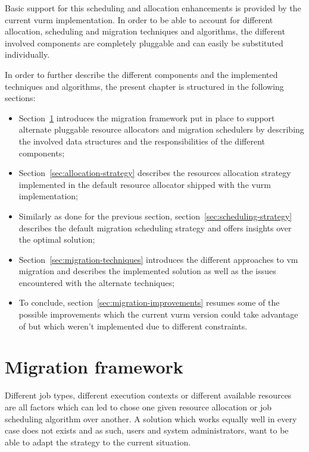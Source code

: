 Basic support for this scheduling and allocation enhancements is provided by the current \gls{vurm} implementation. In order to be able to account for different allocation, scheduling and migration techniques and algorithms, the different involved components are completely pluggable and can easily be substituted individually.

In order to further describe the different components and the implemented techniques and algorithms, the present chapter is structured in the following sections:

\begin{itemize}
	\item Section~\ref{sec:migration-framework} introduces the migration framework put in place to support alternate pluggable resource allocators and migration schedulers by describing the involved data structures and the responsibilities of the different components;
	\item Section~\ref{sec:allocation-strategy} describes the resources allocation strategy implemented in the default resource allocator shipped with the \gls{vurm} implementation;
	\item Similarly as done for the previous section, section~\ref{sec:scheduling-strategy} describes the default migration scheduling strategy and offers insights over the optimal solution;
	\item Section~\ref{sec:migration-techniques} introduces the different approaches to \gls{vm} migration and describes the implemented solution as well as the issues encountered with the alternate techniques;
	\item To conclude, section~\ref{sec:migration-improvements} resumes some of the possible improvements which the current \gls{vurm} version could take advantage of but which weren't implemented due to different constraints.
\end{itemize}


\section{Migration framework}
\label{sec:migration-framework}

Different job types, different execution contexts or different available resources are all factors which can led to chose one given resource allocation or job scheduling algorithm over another. A solution which works equally well in every case does not exists and as such, users and system administrators, want to be able to adapt the strategy to the current situation.

